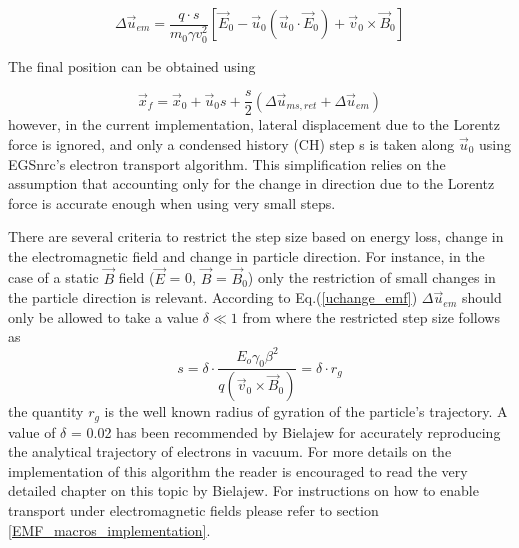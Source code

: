 \begin{equation}
\label{uchange_emf}
    \Delta\vec{u}_{em} = \frac{q \cdot s}{m_0 \gamma v^2_0} \left[\vec{E}_0 - \vec{u}_0(\vec{u}_0\cdot \vec{E}_0) + \vec{v}_0 \times \vec{B}_0\right]
\end{equation}


The final position can be obtained using

\begin{equation}
    \vec{x}_f = \vec{x}_0 + \vec{u}_0 s + \frac{s}{2} \left(\Delta\vec{u}_{ms,ret} + \Delta\vec{u}_{em}\right)
\end{equation}
however, in the current implementation, lateral displacement due to the Lorentz force is ignored, and only a condensed history (CH) step s is taken along $\vec{u}_0$ using EGSnrc's electron transport algorithm. This simplification relies on the assumption that accounting only for the change in direction due to the Lorentz force is accurate enough when using very small steps.

There are several criteria to restrict the step size based on energy loss, change in the electromagnetic field and change in particle direction. For instance, in the case of a static $\vec{B}$ field ($\vec{E}$ = 0, $\vec{B}$ = $\vec{B}_0$) only the restriction of small changes in the particle direction is relevant. According to Eq.(\ref{uchange_emf}) $\Delta\vec{u}_{em}$ should only be allowed to take a value $\delta \ll 1$ from where the restricted step size follows as
\begin{equation}
\label{uchange_restriction}
  s = \delta \cdot \frac{E_o \gamma_0 \beta^2}{q\left(\vec{v}_0 \times \vec{B}_0\right)} = \delta \cdot r_g
\end{equation}
the quantity $r_g$ is the well known radius of gyration of the particle's trajectory. A value of $\delta$ = 0.02 has been recommended by Bielajew for accurately reproducing the analytical trajectory of electrons in vacuum. For more details on the implementation of this algorithm the reader is encouraged to read the very detailed chapter on this topic by Bielajew\cite{Bi89a}. For instructions on how to enable transport under electromagnetic fields please refer to section \ref{EMF_macros_implementation}.

\newpage


